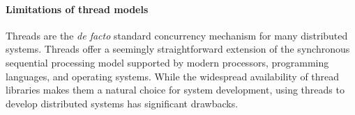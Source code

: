 

\paragraph*{Limitations of thread models}
Threads are the \emph{de facto} standard concurrency mechanism for many distributed systems.
Threads offer a seemingly straightforward extension of the synchronous sequential processing model supported by modern processors, programming languages, and operating systems.
While the widespread availability of thread libraries makes them a natural choice for system development, using threads to develop distributed systems has significant drawbacks.

